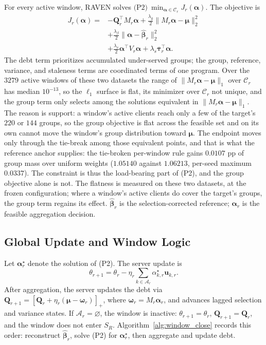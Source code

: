 \documentclass[letterpaper,journal]{IEEEtran}
\begin{document}
For every active window, RAVEN solves
$\text{(P2)}\ \min_{\boldsymbol\alpha\in\mathcal{C}_r}J_r(\boldsymbol\alpha)$.
The objective is
\begin{align}
 J_r(\boldsymbol\alpha)
 ={}&-\mathbf{Q}_r^{\top}M_r\boldsymbol\alpha
 +\frac{\lambda_g}{2}
 \|M_r\boldsymbol\alpha-\boldsymbol\mu\|_2^2
 \nonumber\\
 &+\frac{\lambda_{\beta}}{2}
 \|\boldsymbol\alpha-\widehat{\boldsymbol\beta}_r\|_2^2
 \nonumber\\
 &+\frac{\lambda_v}{2}
 \boldsymbol\alpha^{\top}V_r\boldsymbol\alpha
 +\lambda_s\overline{\boldsymbol\tau}_r^{\top}\boldsymbol\alpha.
\label{eq:P2_objective}
\end{align}
The debt term prioritizes accumulated under-served groups; the group,
reference, variance, and staleness terms are coordinated terms of one
program.  Over the $3279$ active windows of these two datasets the range of
$\|M_r\boldsymbol\alpha-\boldsymbol\mu\|_1$ over $\mathcal{C}_r$ has median
$10^{-13}$, so the $\ell_1$ surface is flat, its minimizer over $\mathcal{C}_r$
not unique, and the group term only selects among the solutions equivalent in
$\|M_r\boldsymbol\alpha-\boldsymbol\mu\|_1$.  The reason is support: a window's
active clients reach only a few of the target's $220$ or $144$ groups, so the
group objective is flat across the feasible set and on its own cannot move the
window's group distribution toward $\boldsymbol\mu$.  The endpoint moves only
through the tie-break among those equivalent points, and that is what the
reference anchor supplies: the tie-broken per-window rule gains $0.0107$ pp of
group mass over uniform weights ($1.05140$ against $1.06213$, per-seed maximum
$0.0337$).  The constraint is thus the load-bearing part of (P2), and the group
objective alone is not.  The flatness is measured on these two datasets, at the
frozen configuration; where a window's active clients do cover the target's
groups, the group term regains its effect.
$\widehat{\boldsymbol\beta}_r$ is the selection-corrected reference;
$\boldsymbol\alpha_r$ is the feasible aggregation decision.

\subsection{Global Update and Window Logic}
\label{subsec:global_update}

Let $\boldsymbol\alpha_r^\star$ denote the solution of (P2).  The server update
is
\begin{equation}
 \theta_{r+1}
 =
 \theta_r
 -
 \eta_r
 \sum_{k\in\mathcal{A}_r}
 \alpha^\star_{k,r}\mathbf{u}_{k,r}.
 \label{eq:server_update}
\end{equation}
After aggregation, the server updates the debt via
$\mathbf{Q}_{r+1}=\left[\mathbf{Q}_r+\eta_r(\boldsymbol\mu-\boldsymbol\omega_r)\right]_+$,
where $\boldsymbol\omega_r=M_r\boldsymbol\alpha_r$, and advances lagged
selection and variance states.  If $\mathcal{A}_r=\varnothing$, the
window is inactive: $\theta_{r+1}=\theta_r$, $\mathbf{Q}_{r+1}=\mathbf{Q}_r$,
and the window does not enter $S_R$.  Algorithm~\ref{alg:window_close}
records this order: reconstruct $\widehat{\boldsymbol\beta}_r$, solve (P2) for
$\boldsymbol\alpha_r^\star$, then aggregate and update debt.
\end{document}
